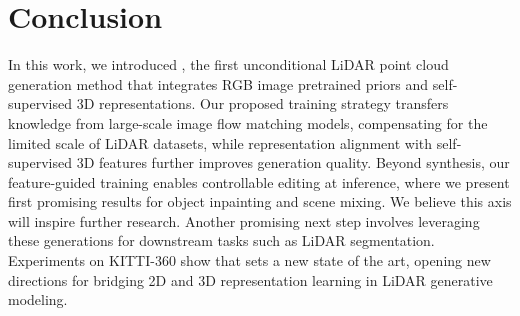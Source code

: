 \section{Conclusion}
In this work, we introduced \ours, the first unconditional LiDAR point cloud generation method that integrates RGB image pretrained priors and self-supervised 3D representations. Our proposed training strategy transfers knowledge from large-scale image flow matching models, compensating for the limited scale of LiDAR datasets, while representation alignment with self-supervised 3D features further improves generation quality.  Beyond synthesis, our feature-guided training enables controllable editing at inference, where we present first promising results for object inpainting and scene mixing. We believe this axis will inspire further research. Another promising next step involves leveraging these generations for downstream tasks such as LiDAR segmentation. Experiments on KITTI-360 show that \ours sets a new state of the art, opening new directions for bridging 2D and 3D representation learning in LiDAR generative modeling.